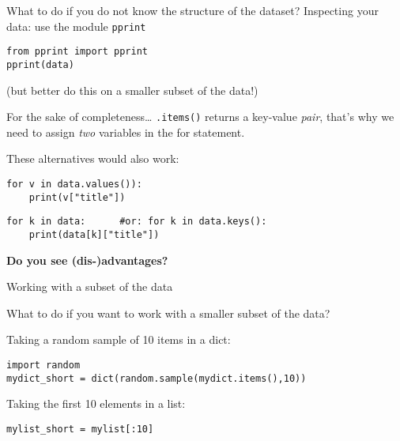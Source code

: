 \documentclass{beamer}
\begin{document}
\begin{frame}[fragile]{What to do if you do not know the structure of the dataset?}
Inspecting your data: use the module \texttt{pprint} 
\begin{lstlisting}
from pprint import pprint
pprint(data)
\end{lstlisting}

(but better do this on a smaller subset of the data!)
\end{frame}


\begin{frame}[plain]{}
\end{frame}

\begin{frame}[plain]{}
\end{frame}


\begin{frame}[fragile]{For the sake of completeness\ldots}
\texttt{.items()} returns a key-value \emph{pair}, that's why we need to assign \emph{two} variables in the for statement.

These alternatives would also work:
\begin{lstlisting}
for v in data.values()):
	print(v["title"])
\end{lstlisting}

\begin{lstlisting}
for k in data:      #or: for k in data.keys():
	print(data[k]["title"])
\end{lstlisting}

\textbf{Do you see (dis-)advantages?}
\end{frame}



\begin{frame}[fragile]{Working with a subset of the data}
	
What to do if you want to work with a smaller subset of the data?

Taking a random sample of 10 items in a dict:
	\begin{lstlisting}
import random
mydict_short = dict(random.sample(mydict.items(),10))
	\end{lstlisting}
	
Taking the first 10 elements in a list:
	\begin{lstlisting}
mylist_short = mylist[:10]
	\end{lstlisting}

\end{frame}
\end{document}
